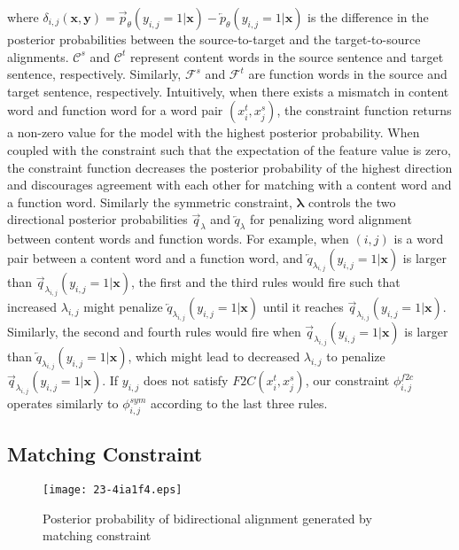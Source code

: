 \documentclass[english]{jnlp_1.4}
\begin{document}
where $\delta_{i,j}(\boldsymbol{x}, \boldsymbol{y}) = \overrightarrow{p}_\theta(y_{i,j}=1 | \boldsymbol{x}) -  \overleftarrow{p}_\theta(y_{i,j}=1 | \boldsymbol{x}) $ is the difference in the posterior probabilities between the source-to-target and the target-to-source alignments.
$\mathcal{C}^s$ and $\mathcal{C}^t$ represent content words in the source sentence and target  sentence, respectively.
Similarly, $\mathcal{F}^s$ and $\mathcal{F}^t$ are function words in the source and target sentence, respectively.
Intuitively, when there exists a mismatch in content word and function word for a word pair $(x^t_i, x^s_j)$, the constraint function returns a non-zero value for the model with the highest posterior probability.
When coupled with the constraint such that the expectation of the feature value is zero, the constraint function decreases the posterior probability of the highest direction and discourages agreement with each other for matching with a content word and a function word.
Similarly the symmetric constraint, $\boldsymbol{\lambda}$ controls the two directional posterior probabilities $\overrightarrow{q}_{\lambda}$ and $\overleftarrow{q}_{\lambda}$ for penalizing  word alignment between content words and function words.
For example, when $(i,j)$ is a word pair between a content word and a function word, and $\overleftarrow{q}_{\lambda_{i,j}}(y_{i,j}=1|\boldsymbol{x})$ is larger than $\overrightarrow{q}_{\lambda_{i,j}}(y_{i,j}=1|\boldsymbol{x})$, 
the first and the third rules would fire such that increased $\lambda_{i,j}$ might penalize $\overleftarrow{q}_{\lambda_{i,j}}(y_{i,j}=1|\boldsymbol{x})$ until it reaches $\overrightarrow{q}_{\lambda_{i,j}}(y_{i,j}=1|\boldsymbol{x})$.
Similarly, the second and fourth rules would fire when $\overrightarrow{q}_{\lambda_{i,j}}(y_{i,j}=1|\boldsymbol{x})$ is larger than $\overleftarrow{q}_{\lambda_{i,j}}(y_{i,j}=1|\boldsymbol{x})$, which might lead to decreased $\lambda_{i,j}$ to penalize $\overrightarrow{q}_{\lambda_{i,j}}(y_{i,j}=1|\boldsymbol{x})$.
If $y_{i,j}$ does not satisfy $\mathit{F2C}(x^t_i, x^s_j)$, our constraint $\phi^{\mathit{f2c}}_{i, j}$ operates similarly to $\phi^{\mathit{sym}}_{i, j}$ according to the last three rules. 


\subsection{Matching Constraint}
\label{subsec:match}

\begin{figure}[b]
\begin{center}
\texttt{[image: 23-4ia1f4.eps]}
\end{center}
  \caption{Posterior probability of bidirectional alignment generated by matching constraint}
  \label{fig:ex3}
\end{figure}
\end{document}
